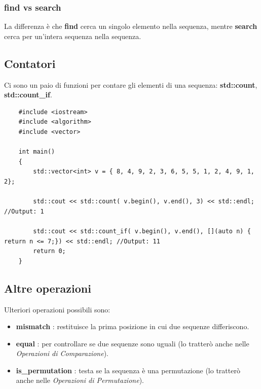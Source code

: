 \subsubsection{find vs search}

\textsf{\small La differenza è che \textbf{find} cerca un singolo elemento nella sequenza, mentre \textbf{search} cerca per un'intera sequenza nella sequenza. } \\

\subsection{Contatori}

\textsf{\small Ci sono un paio di funzioni per contare gli elementi di una sequenza: \textbf{std::count}, \textbf{std::count\_if}.} \\

\begin{lstlisting}
	#include <iostream>
	#include <algorithm>
	#include <vector>
	
	int main()
	{
		std::vector<int> v = { 8, 4, 9, 2, 3, 6, 5, 5, 1, 2, 4, 9, 1, 2};
		
		std::cout << std::count( v.begin(), v.end(), 3) << std::endl; //Output: 1
		
		std::cout << std::count_if( v.begin(), v.end(), [](auto n) { return n <= 7;}) << std::endl; //Output: 11
		return 0;
	}
\end{lstlisting}

\subsection{Altre operazioni}

\textsf{\small Ulteriori operazioni possibili sono: } \\

\begin{itemize}
	\item \textsf{\small \textbf{mismatch} : restituisce la prima posizione in cui due sequenze differiscono.}
	\item \textsf{\small \textbf{equal} : per controllare se due sequenze sono uguali (lo tratterò anche nelle \emph{Operazioni di Comparazione}).}
	\item \textsf{\small \textbf{is\_permutation} : testa se la sequenza è una permutazione (lo tratterò anche nelle \emph{Operazioni di Permutazione}).}
\end{itemize}

